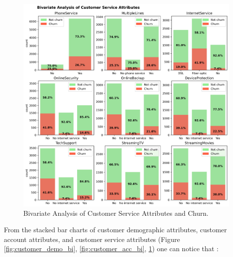 \begin{figure}[H]
	\centering
	\includegraphics[width=1\linewidth]{figures/customer_service_bi}
	\caption{Bivariate Analysis of Customer Service Attributes and Churn.}
	\label{fig:customer_service_bi}
\end{figure}
 From the stacked bar charts of customer demographic attributes, customer account attributes, and customer service attributes (Figure \ref{fig:customer_demo_bi}, \ref{fig:customer_acc_bi}, \ref{fig:customer_service_bi}) one can notice that :
